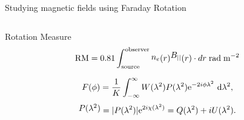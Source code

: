 \documentclass[xetex,aspectratio=169]{beamer}
\newcommand{\mypos}[2]{\tikz[remember picture]{\node[inner sep=0pt, anchor=base](#2){#1};}}
\begin{document}
    \begin{frame}{Studying magnetic fields using Faraday Rotation}
    \footnotesize
    \begin{columns}
		
		\begin{column}{0.55\textwidth}
			
			
			
			\begin{block}{Rotation Measure}
				\begin{equation*}
					\mypos{\text{RM}}{rm} = 0.81 \int_{\text{source}}^{\text{observer}} \mypos{$n_e$}{ne}(r) \mypos{$B_{||}$}{be}(r) \cdot dr\; \text{rad}\;\text{m}^{-2}
				\end{equation*}
			\end{block}

			\begin{equation*}
				\label{eq:fourier}
				F(\phi) = \frac{1}{K} \int_{-\infty}^{\infty}{ W(\lambda^2)P(\lambda^2){\rm e}^{-2i\phi \lambda^2}~{\rm d}\lambda^2 },
			\end{equation*}
			\begin{equation*}
				\label{eq:pol}
				\mypos{$P(\lambda^2)$}{ppos} = |P(\lambda^2)|{\rm e}^{2i\chi(\lambda^2)} = Q(\lambda^2) + iU(\lambda^2).
			\end{equation*}
		\end{column}


\end{columns}
\end{frame}
\end{document}
